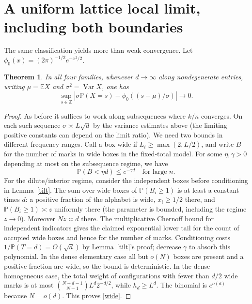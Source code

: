 \documentclass[11pt]{article}
\newtheorem{thm}{Theorem}\newtheorem{lem}{Lemma}\newcommand{\Var}{\operatorname{Var}}\newcommand{\Cov}{\operatorname{Cov}}\newcommand{\E}{\mathbb E}\newcommand{\Prob}{\mathbb P}
\begin{document}
\section{A uniform lattice local limit, including both boundaries}
The same classification yields more than weak convergence. Let $\phi_0(x)=(2\pi)^{-1/2}e^{-x^2/2}$.
\begin{thm}\label{local}In all four families, whenever $d\to\infty$ along nondegenerate entries, writing $\mu=\E X$ and $\sigma^2=\Var X$, one has
\[
\sup_{s\in\mathbb Z}\left|\sigma\Prob(X=s)-\phi_0((s-\mu)/\sigma)\right|\longrightarrow0 .
\]
\end{thm}
\begin{proof}
As before it suffices to work along subsequences where $k/n$ converges. On each such sequence $\sigma\asymp L\sqrt d$ by the variance estimates above (the limiting positive constants can depend on the limit ratio). We need two bounds in different frequency ranges. Call a box wide if $L_i\ge\max(2,L/2)$, and write $B$ for the number of marks in wide boxes in the fixed-total model. For some $\eta,\gamma>0$ depending at most on the subsequence regime, we have
\begin{equation} \Prob(B<\eta d)\le e^{-\gamma d}\quad\text{for large }n.\label{wide}\end{equation}
For the dilute/interior regime, consider the independent boxes before conditioning in Lemma~\ref{tilt}. The sum over wide boxes of $\Prob(B_i\ge1)$ is at least a constant times $d$: a positive fraction of the alphabet is wide, $x_i\ge1/2$ there, and $\Prob(B_i\ge1)\asymp z$ uniformly there (the parameter is bounded, including the regime $z\to0$). Moreover $Nz\asymp d$ there. The multiplicative Chernoff bound for independent indicators gives the claimed exponential lower tail for the count of occupied wide boxes and hence for the number of marks. Conditioning costs $1/\Prob(T=d)=O(\sqrt d)$ by Lemma~\ref{tilt}'s proof; decrease $\gamma$ to absorb this polynomial. In the dense elementary case all but $o(N)$ boxes are present and a positive fraction are wide, so the bound is deterministic. In the dense homogeneous case, the total weight of configurations with fewer than $d/2$ wide marks is at most $\binom{N+d-1}{N-1}L^d 2^{-d/2}$, while $h_d\ge L^d$. The binomial is $e^{o(d)}$ because $N=o(d)$. This proves \eqref{wide}.
 

\end{proof}
\end{document}
